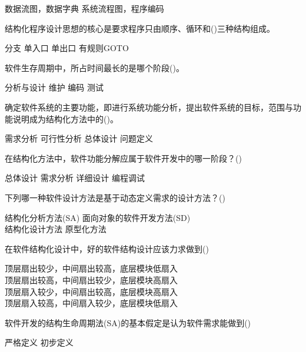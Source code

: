 \documentclass{exam}
\begin{document}
\begin{questions}
\begin{oneparchoices}
		\correctchoice 数据流图，数据字典
		\choice 系统流程图，程序编码
	\end{oneparchoices}
	\question 结构化程序设计思想的核心是要求程序只由顺序、循环和()三种结构组成。\\
	\begin{oneparchoices}
		\correctchoice 分支
		\choice 单入口
		\choice 单出口
		\choice 有规则GOTO
	\end{oneparchoices}
	\question 软件生存周期中，所占时间最长的是哪个阶段()。\\
	\begin{oneparchoices}
		\choice 分析与设计
		\correctchoice 维护
		\choice 编码
		\choice 测试
	\end{oneparchoices}
	\question 确定软件系统的主要功能，即进行系统功能分析，提出软件系统的目标，范围与功能说明成为结构化方法中的()。\\
	\begin{oneparchoices}
		\correctchoice 需求分析
		\choice 可行性分析
		\choice 总体设计
		\choice 问题定义
	\end{oneparchoices}
	\question 在结构化方法中，软件功能分解应属于软件开发中的哪一阶段？()\\
	\begin{oneparchoices}
		\correctchoice 总体设计
		\choice 需求分析
		\choice 详细设计
		\choice 编程调试
	\end{oneparchoices}
	\question 下列哪一种软件设计方法是基于动态定义需求的设计方法？()\\
	\begin{oneparchoices}
		\choice 结构化分析方法(SA)
		\correctchoice 面向对象的软件开发方法(SD)\\
		\choice 结构化设计方法
		\choice 原型化方法
	\end{oneparchoices}
	\question 在软件结构化设计中，好的软件结构设计应该力求做到()\\
	\begin{oneparchoices}
		\choice 顶层扇出较少，中间扇出较高，底层模块低扇入\\
		\correctchoice 顶层扇出较高，中间扇出较少，底层模块高扇入\\
		\choice 顶层扇入较少，中间扇出较高，底层模块高扇入\\
		\choice 顶层扇入较高，中间扇入较少，底层模块低扇入
	\end{oneparchoices}
	\question 软件开发的结构生命周期法(SA)的基本假定是认为软件需求能做到()\\
	\begin{oneparchoices}
		\correctchoice 严格定义
		\choice 初步定义

\end{oneparchoices}
\end{questions}
\end{document}
